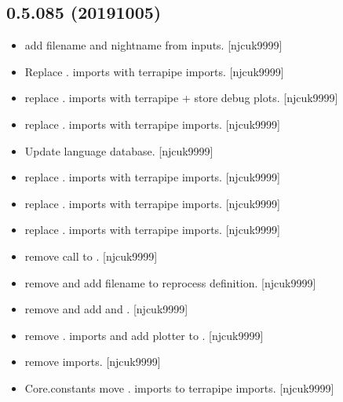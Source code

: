 \documentclass[a4paper,10pt,english]{report}
\begin{document}
\subsection{0.5.085 (2019\sphinxhyphen{}10\sphinxhyphen{}05)}
\label{\detokenize{misc/changelog:id76}}\begin{itemize}
\item {} 
 \sphinxhyphen{} add filename and nightname from
inputs. {[}njcuk9999{]}

\item {} 
Replace . imports with terrapipe imports. {[}njcuk9999{]}

\item {} 
 \sphinxhyphen{} replace . imports with terrapipe + store debug
plots. {[}njcuk9999{]}

\item {} 
 \sphinxhyphen{} replace . imports with terrapipe imports.
{[}njcuk9999{]}

\item {} 
Update language database. {[}njcuk9999{]}

\item {} 
 \sphinxhyphen{} replace . imports with terrapipe imports. {[}njcuk9999{]}

\item {} 
 \sphinxhyphen{} replace . imports with terrapipe imports.
{[}njcuk9999{]}

\item {} 
 \sphinxhyphen{} replace . imports with terrapipe imports. {[}njcuk9999{]}

\item {} 
 \sphinxhyphen{} remove call to
. {[}njcuk9999{]}

\item {} 
 \sphinxhyphen{} remove  and
add filename to reprocess definition. {[}njcuk9999{]}

\item {} 
 \sphinxhyphen{} remove  and add
 and . {[}njcuk9999{]}

\item {} 
 \sphinxhyphen{} remove . imports and add plotter to .
{[}njcuk9999{]}

\item {} 
 \sphinxhyphen{} remove imports. {[}njcuk9999{]}

\item {} 
Core.constants \sphinxhyphen{} move . imports to terrapipe imports. {[}njcuk9999{]}

\end{itemize}
\end{document}
